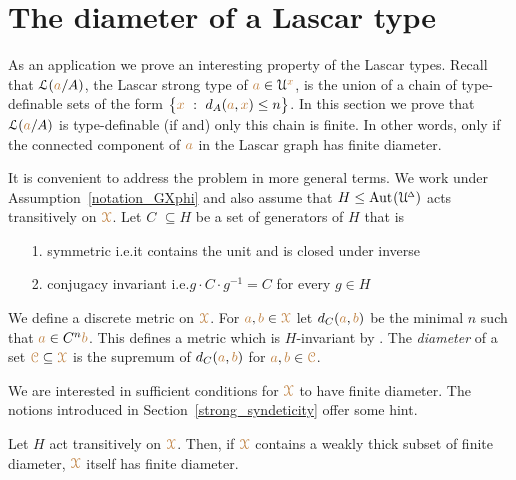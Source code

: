 \section{The diameter of a Lascar type}\label{newelski}

As an application we prove an interesting property of the Lascar types.
Recall that $\EuScript L({\color{brown} a}/A)$, the Lascar strong type of ${\color{brown} a}\in\EuScript U^{\color{brown} x}$, is the union of a chain of type-definable sets of the form $\big\{{\color{brown} x}\ :\ d_A({\color{brown} a},{\color{brown} x})\le n\big\}$.
In this section we prove that $\EuScript L({\color{brown} a}/A)$ is type-definable (if and) only this chain is finite.
In other words, only if the connected component of ${\color{brown} a}$ in the Lascar graph has finite diameter.

It is convenient to address the problem in more general terms.
We work under Assumption~\ref{notation_GXphi} and also assume that $H\le{\rm Aut\kern.15ex}(\EuScript U\kern-.2ex^{\scriptscriptstyle\Delta})$ acts transitively on ${\color{brown}\EuScript X}$.
Let \emph{$C$\/} $\subseteq H$ be a set of generators of $H$ that is
\begin{itemize}
  \item[1.] symmetric i.e.\@ it contains the unit and is closed under inverse
  \item[2.] conjugacy invariant i.e.\@ $g{\cdot}C{\cdot}g^{-1}=C$ for every $g\in H$
\end{itemize}

We define a discrete metric on ${\color{brown}\EuScript X}$.
For ${\color{brown} a},{\color{brown} b}\in{\color{brown}\EuScript X}$ let \emph{$d_C({\color{brown} a},{\color{brown} b})$\/} be the minimal $n$ such that ${\color{brown} a}\in C^n{\color{brown} b}$.
This defines a metric which is $H$-invariant by .
The \emph{diameter\/} of a set ${\color{brown}\EuScript C}\subseteq{\color{brown}\EuScript X}$ is the supremum of $d_C({\color{brown} a},{\color{brown} b})$ for ${\color{brown} a},{\color{brown} b}\in{\color{brown}\EuScript C}$.

We are interested in sufficient conditions for ${\color{brown}\EuScript X}$ to have finite diameter.
The notions introduced in Section~\ref{strong_syndeticity} offer some hint.

\begin{proposition}\label{prop_wpers_finite_diameter}
  Let $H$ act transitively on ${\color{brown}\EuScript X}$.
  Then, if ${\color{brown}\EuScript X}$ contains a weakly thick subset of finite diameter, ${\color{brown}\EuScript X}$ itself has finite diameter.
\end{proposition}

